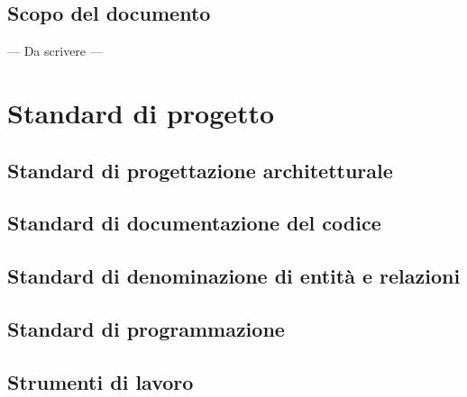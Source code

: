 \section{Scopo del documento}
--- Da scrivere ---



\chapter{Standard di progetto}
\thispagestyle{fancy} %

\section{Standard di progettazione architetturale}
\section{Standard di documentazione del codice}
\section{Standard di denominazione di entit\`a e relazioni}
\section{Standard di programmazione}
\section{Strumenti di lavoro}


\newpage
